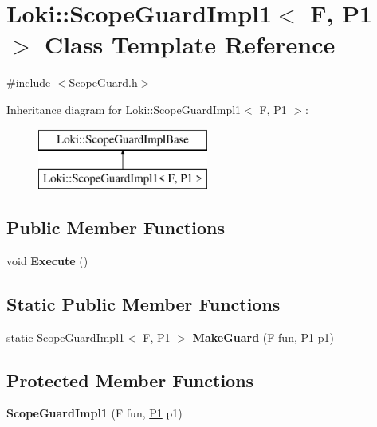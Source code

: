 \hypertarget{classLoki_1_1ScopeGuardImpl1}{}\section{Loki\+:\+:Scope\+Guard\+Impl1$<$ F, P1 $>$ Class Template Reference}
\label{classLoki_1_1ScopeGuardImpl1}


{\ttfamily \#include $<$Scope\+Guard.\+h$>$}

Inheritance diagram for Loki\+:\+:Scope\+Guard\+Impl1$<$ F, P1 $>$\+:\begin{figure}[H]
\begin{center}
\leavevmode
\includegraphics[height=2.000000cm]{classLoki_1_1ScopeGuardImpl1}
\end{center}
\end{figure}
\subsection*{Public Member Functions}
\begin{DoxyCompactItemize}
\item 
\hypertarget{classLoki_1_1ScopeGuardImpl1_a3717b9f4cfdd3632d029fb9883e70ca9}{}void {\bfseries Execute} ()\label{classLoki_1_1ScopeGuardImpl1_a3717b9f4cfdd3632d029fb9883e70ca9}

\end{DoxyCompactItemize}
\subsection*{Static Public Member Functions}
\begin{DoxyCompactItemize}
\item 
\hypertarget{classLoki_1_1ScopeGuardImpl1_ab3453d579c44274c68be48af1ae88556}{}static \hyperlink{classLoki_1_1ScopeGuardImpl1}{Scope\+Guard\+Impl1}$<$ F, \hyperlink{structP1}{P1} $>$ {\bfseries Make\+Guard} (F fun, \hyperlink{structP1}{P1} p1)\label{classLoki_1_1ScopeGuardImpl1_ab3453d579c44274c68be48af1ae88556}

\end{DoxyCompactItemize}
\subsection*{Protected Member Functions}
\begin{DoxyCompactItemize}
\item 
\hypertarget{classLoki_1_1ScopeGuardImpl1_ab38863b25de1a7cf1cfdbb0cd0c3aa12}{}{\bfseries Scope\+Guard\+Impl1} (F fun, \hyperlink{structP1}{P1} p1)\label{classLoki_1_1ScopeGuardImpl1_ab38863b25de1a7cf1cfdbb0cd0c3aa12}

\end{DoxyCompactItemize}
